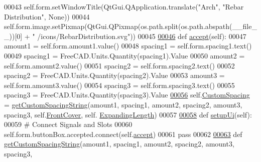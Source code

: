 \begin{DoxyCode}
00043         self.form.setWindowTitle(QtGui.QApplication.translate(\textcolor{stringliteral}{"Arch"}, \textcolor{stringliteral}{"Rebar Distribution"}, \textcolor{keywordtype}{None}))
00044         self.form.image.setPixmap(QtGui.QPixmap(os.path.split(os.path.abspath(\_\_file\_\_))[0] + \textcolor{stringliteral}{"
      /icons/RebarDistribution.svg"}))
00045 
\hypertarget{RebarDistribution_8py_source.tex_l00046}{}\hyperlink{classRebarDistribution_1_1__RebarDistributionDialog_a518692f4a12113a2bcdfeaa0676f87be}{00046}     \textcolor{keyword}{def }\hyperlink{classRebarDistribution_1_1__RebarDistributionDialog_a518692f4a12113a2bcdfeaa0676f87be}{accept}(self):
00047         amount1 = self.form.amount1.value()
00048         spacing1 = self.form.spacing1.text()
00049         spacing1 = FreeCAD.Units.Quantity(spacing1).Value
00050         amount2 = self.form.amount2.value()
00051         spacing2 = self.form.spacing2.text()
00052         spacing2 = FreeCAD.Units.Quantity(spacing2).Value
00053         amount3 = self.form.amount3.value()
00054         spacing3 = self.form.spacing3.text()
00055         spacing3 = FreeCAD.Units.Quantity(spacing3).Value
\hypertarget{RebarDistribution_8py_source.tex_l00056}{}\hyperlink{classRebarDistribution_1_1__RebarDistributionDialog_a97a0dcc8195e3f9e489565af80c0674c}{00056}         self.\hyperlink{classRebarDistribution_1_1__RebarDistributionDialog_a97a0dcc8195e3f9e489565af80c0674c}{CustomSpacing} = \hyperlink{namespaceRebarDistribution_a22a12f260218752c4099cf68e4e3da5c}{getCustomSpacingString}(amount1, spacing1, 
      amount2, spacing2, amount3, spacing3, self.\hyperlink{classRebarDistribution_1_1__RebarDistributionDialog_aeda0fd1b138f0b5f3b79d5c6e622b650}{FrontCover}, self.
      \hyperlink{classRebarDistribution_1_1__RebarDistributionDialog_a4d1d9185846a10dff90c07a397077ae2}{ExpandingLength})
00057 
\hypertarget{RebarDistribution_8py_source.tex_l00058}{}\hyperlink{classRebarDistribution_1_1__RebarDistributionDialog_aa96660ccded2b2b91a36a8099199842d}{00058}     \textcolor{keyword}{def }\hyperlink{classRebarDistribution_1_1__RebarDistributionDialog_aa96660ccded2b2b91a36a8099199842d}{setupUi}(self):
00059         \textcolor{comment}{# Connect Signals and Slots}
00060         self.form.buttonBox.accepted.connect(self.\hyperlink{classRebarDistribution_1_1__RebarDistributionDialog_a518692f4a12113a2bcdfeaa0676f87be}{accept})
00061         \textcolor{keywordflow}{pass}
00062 
\hypertarget{RebarDistribution_8py_source.tex_l00063}{}\hyperlink{namespaceRebarDistribution_a22a12f260218752c4099cf68e4e3da5c}{00063} \textcolor{keyword}{def }\hyperlink{namespaceRebarDistribution_a22a12f260218752c4099cf68e4e3da5c}{getCustomSpacingString}(amount1, spacing1, amount2, spacing2, amount3, spacing3, 

\end{DoxyCode}

